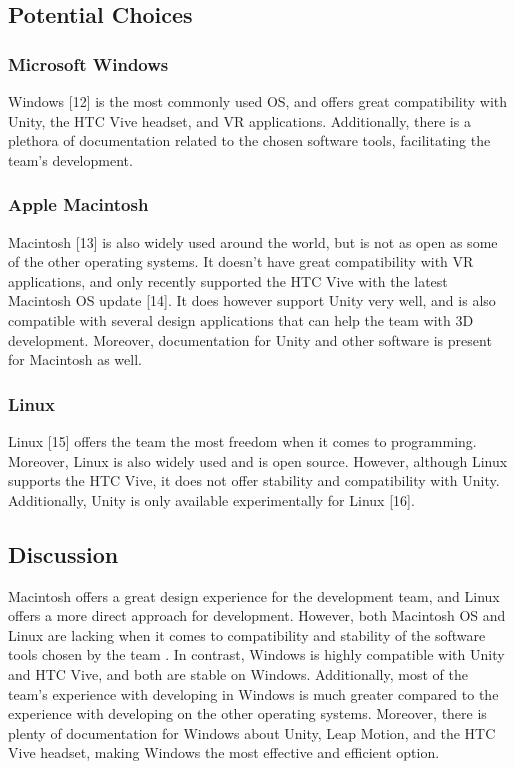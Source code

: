\documentclass[letterpaper,10pt,onecolumn,compsoc]{IEEEtran}
\begin{document}
\subsection{Potential Choices}

\subsubsection{Microsoft Windows}
Windows [12] is the most commonly used OS, and offers great compatibility with Unity, the HTC Vive headset, and VR applications. Additionally, there is a plethora of documentation related to the chosen software tools, facilitating the team’s development. 

\subsubsection{Apple Macintosh}
Macintosh [13] is also widely used around the world, but is not as open as some of the other operating systems. It doesn’t have great compatibility with VR applications, and only recently supported the HTC Vive with the latest Macintosh OS update [14]. It does however support Unity very well, and is also compatible with several design applications that can help the team with 3D development. Moreover, documentation for Unity and other software is present for Macintosh as well.

\subsubsection{Linux}
Linux [15] offers the team the most freedom when it comes to programming. Moreover, Linux is also widely used and is open source. However, although Linux supports the HTC Vive, it does not offer stability and compatibility with Unity. Additionally, Unity is only available experimentally for Linux [16]. 

\subsection{Discussion}
Macintosh offers a great design experience for the development team, and Linux offers a more direct approach for development. However, both Macintosh OS and Linux are lacking when it comes to compatibility and stability of the software tools chosen by the team . In contrast, Windows is highly compatible with Unity and HTC Vive, and both are stable on Windows. Additionally, most of the team’s experience with developing in Windows is much greater compared to the experience with developing on the other operating systems. Moreover, there is plenty of documentation for Windows about Unity, Leap Motion, and the HTC Vive headset, making Windows the most effective and efficient option.
\end{document}
